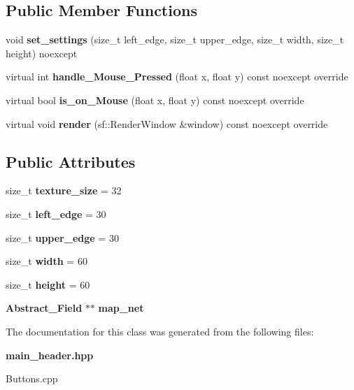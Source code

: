 \subsection*{Public Member Functions}
\begin{DoxyCompactItemize}
\item 
\mbox{\label{class_map___net_a72098dca512b6086584c4e214c508deb}} 
void {\bfseries set\+\_\+settings} (size\+\_\+t left\+\_\+edge, size\+\_\+t upper\+\_\+edge, size\+\_\+t width, size\+\_\+t height) noexcept
\item 
\mbox{\label{class_map___net_a0ba6c77ccedf4b8bb2102b15280c86f8}} 
virtual int {\bfseries handle\+\_\+\+Mouse\+\_\+\+Pressed} (float x, float y) const noexcept override
\item 
\mbox{\label{class_map___net_a8fedbbe40c44d1a4b246b1411e67ed00}} 
virtual bool {\bfseries is\+\_\+on\+\_\+\+Mouse} (float x, float y) const noexcept override
\item 
\mbox{\label{class_map___net_a0ca23d4daf65cf43570dbb48daaf915e}} 
virtual void {\bfseries render} (sf\+::\+Render\+Window \&window) const noexcept override
\end{DoxyCompactItemize}
\subsection*{Public Attributes}
\begin{DoxyCompactItemize}
\item 
\mbox{\label{class_map___net_ab5a79d93310eda767ec819bdfedba1c1}} 
size\+\_\+t {\bfseries texture\+\_\+size} = 32
\item 
\mbox{\label{class_map___net_a4a91668f7ca122ce7aac8283cca3dca9}} 
size\+\_\+t {\bfseries left\+\_\+edge} = 30
\item 
\mbox{\label{class_map___net_a881563a0a6a643caef6c94a06f5733ca}} 
size\+\_\+t {\bfseries upper\+\_\+edge} = 30
\item 
\mbox{\label{class_map___net_a21ece0792b6162c518566756afe67bd1}} 
size\+\_\+t {\bfseries width} = 60
\item 
\mbox{\label{class_map___net_a9fd41f4e69151c0042e564b1b98cc607}} 
size\+\_\+t {\bfseries height} = 60
\item 
\mbox{\label{class_map___net_aea7e8999905efe6d88c6506f7b7839d1}} 
\textbf{ Abstract\+\_\+\+Field} $\ast$$\ast$ {\bfseries map\+\_\+net}
\end{DoxyCompactItemize}


The documentation for this class was generated from the following files\+:\begin{DoxyCompactItemize}
\item 
\textbf{ main\+\_\+header.\+hpp}\item 
Buttons.\+cpp\end{DoxyCompactItemize}
